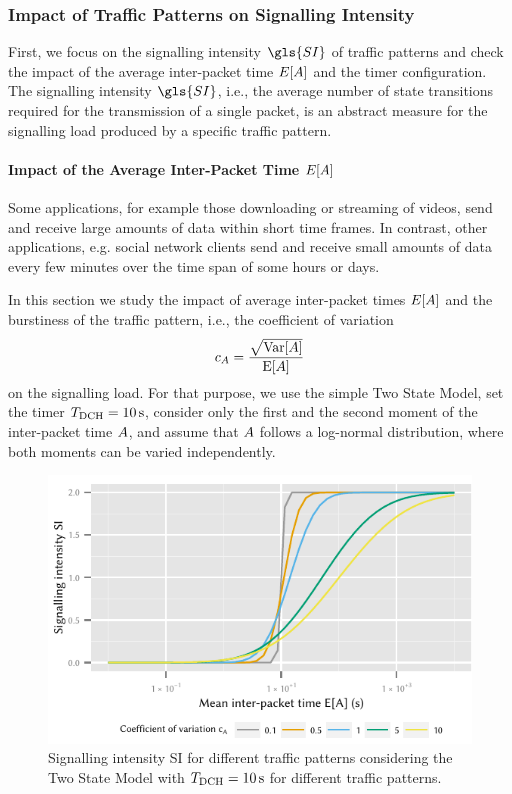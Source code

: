 \subsubsection*{Impact of Traffic Patterns on Signalling Intensity}\label{sec:network:performance_model:signalling_intensity}
First, we focus on the signalling intensity \(\gls{SI}\) of traffic patterns and check the impact of the average inter-packet time \(E[A]\) and the timer configuration. The signalling intensity \(\gls{SI}\), i.e., the average number of state transitions required for the transmission of a single packet, is an abstract measure for the signalling load produced by a specific traffic pattern.

\paragraph*{Impact of the Average Inter-Packet Time \(E[A]\)}\label{sec:network:performance_model:signalling_intensity:ea}
Some applications, for example those downloading or streaming of videos, send and receive large amounts of data within short time frames.
In contrast, other applications, e.g. social network clients send and receive small amounts of data every few minutes over the time span of some hours or days.

In this section we study the impact of average inter-packet times \(E[A]\) and the burstiness of the traffic pattern, i.e., the coefficient of variation
\[c_{A} = \frac{\sqrt{\mathrm{Var}[A]}}{\mathrm{E}[A]}\]
 on the signalling load.
For that purpose, we use the simple Two State Model, set the timer \(T_{\text{DCH}}=\SI{10}{\second}\), consider only the first and the second moment of the inter-packet time \(A\), and assume that \(A\) follows a log-normal distribution, where both moments can be varied independently.

\begin{figure}
	\centering
	\includegraphics{network/performance_model/numerical_examples/figures/2state_ea_si}
	\caption{Signalling intensity \gls{SI} for different traffic patterns considering the Two State Model with \(T_{\text{DCH}}=\SI{10}{\second}\) for different traffic patterns.}
	\label{fig:network:performance_model:numerical_examples:validations:analytic_vs_simulation:2state_ea_si}
\end{figure}

